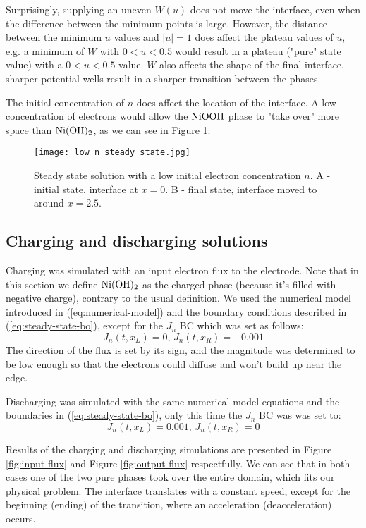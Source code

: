 \documentclass[12pt]{article}
\begin{document}
Surprisingly, supplying an uneven $W(u)$ does not move the interface, even when the difference between the minimum points is large. However, the distance between the minimum $u$ values and $|u|=1$ does affect the plateau values of $u$, e.g. a minimum of $W$ with $0<u<0.5$ would result in a plateau ("pure" state value) with a $0<u<0.5$ value. $W$ also affects the shape of the final interface, sharper potential wells result in a sharper transition between the phases.

The initial concentration of $n$ does affect the location of the interface. A low concentration of electrons would allow the $\ce{NiOOH}$ phase to "take over" more space than $\ce{Ni(OH)_2}$, as we can see in Figure \ref{fig:low-n-ss}.

\begin{figure}[h!] 
	\centering 
	\texttt{[image: low n steady state.jpg]}
	\caption{Steady state solution with a low initial electron concentration $n$. A - initial state, interface at $x=0$. B - final state, interface moved to around $x=2.5$.} \label{fig:low-n-ss}
\end{figure}

\pagebreak
\subsection{Charging and discharging solutions}
Charging was simulated with an input electron flux to the electrode. Note that in this section we define $\ce{Ni(OH)_2}$ as the charged phase (because it's filled with negative charge), contrary to the usual definition.  We used the numerical model introduced in (\ref{eq:numerical-model}) and the boundary conditions described in (\ref{eq:steady-state-bo}), except for the $J_n$ BC which was set as follows:
\begin{equation}
    J_n(t, x_L) = 0, \, J_n(t, x_R) = -0.001
\end{equation}
The direction of the flux is set by its sign, and the magnitude was determined to be low enough so that the electrons could diffuse and won't build up near the edge.

Discharging was simulated with the same numerical model equations and the boundaries in (\ref{eq:steady-state-bo}), only this time the $J_n$ BC was was set to:
\begin{equation}
    J_n(t, x_L) = 0.001, \, J_n(t, x_R) = 0
\end{equation}

Results of the charging and discharging simulations are presented in Figure \ref{fig:input-flux} and Figure \ref{fig:output-flux} respectfully. We can see that in both cases one of the two pure phases took over the entire domain, which fits our physical problem. The interface translates with a constant speed, except for the beginning (ending) of the transition, where an acceleration (deacceleration) occurs. 
\end{document}
